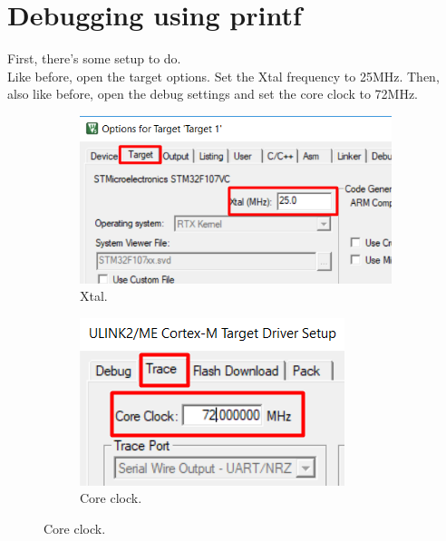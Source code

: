 \documentclass{article}
\begin{document}
\section{Debugging using printf}
First, there's some setup to do.\\
Like before, open the target options. Set the Xtal frequency to 25MHz. Then, also like before,
open the debug settings and set the core clock to 72MHz.
\begin{figure}[h!]
    \centering
    \begin{subfigure}[b]{0.45\linewidth}
        \includegraphics[width=\linewidth]{pics/Xtal.png}
        \caption{Xtal.}
    \end{subfigure}
    \begin{subfigure}[b]{0.45\linewidth}
        \includegraphics[width=\linewidth]{pics/DebugCoreClock.png}
        \caption{Core clock.}
    \end{subfigure}
    \label{fig:Xtal}
\end{figure}
\end{document}
